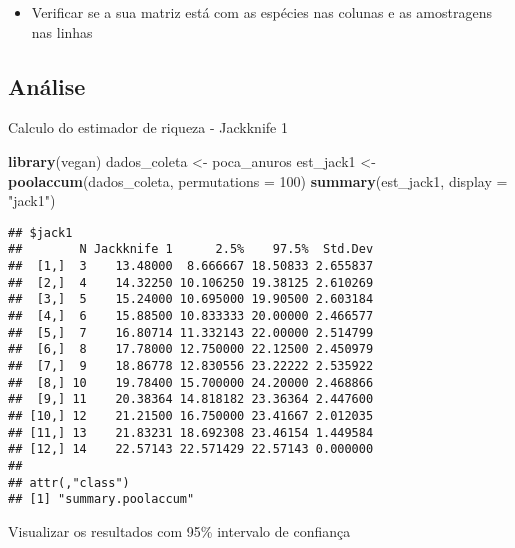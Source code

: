 \documentclass[
]{book}
\newenvironment{Shaded}{\begin{snugshade}}{\end{snugshade}}
\newcommand{\DataTypeTok}[1]{\textcolor[rgb]{0.13,0.29,0.53}{#1}}
\newcommand{\DecValTok}[1]{\textcolor[rgb]{0.00,0.00,0.81}{#1}}
\newcommand{\KeywordTok}[1]{\textcolor[rgb]{0.13,0.29,0.53}{\textbf{#1}}}
\newcommand{\NormalTok}[1]{#1}
\newcommand{\StringTok}[1]{\textcolor[rgb]{0.31,0.60,0.02}{#1}}
\providecommand{\tightlist}{%
  \setlength{\itemsep}{0pt}\setlength{\parskip}{0pt}}
\begin{document}
\begin{itemize}
\tightlist
\item
  Verificar se a sua matriz está com as espécies nas colunas e as amostragens nas linhas
\end{itemize}

\hypertarget{anuxe1lise-3}{%
\subsection{Análise}\label{anuxe1lise-3}}

Calculo do estimador de riqueza - Jackknife 1

\begin{Shaded}
\begin{Highlighting}[]
\KeywordTok{library}\NormalTok{(vegan)}
\NormalTok{dados_coleta <-}\StringTok{ }\NormalTok{poca_anuros}
\NormalTok{est_jack1 <-}\StringTok{ }\KeywordTok{poolaccum}\NormalTok{(dados_coleta, }\DataTypeTok{permutations =} \DecValTok{100}\NormalTok{)}
\KeywordTok{summary}\NormalTok{(est_jack1, }\DataTypeTok{display =} \StringTok{"jack1"}\NormalTok{)}
\end{Highlighting}
\end{Shaded}

\begin{verbatim}
## $jack1
##        N Jackknife 1      2.5%    97.5%  Std.Dev
##  [1,]  3    13.48000  8.666667 18.50833 2.655837
##  [2,]  4    14.32250 10.106250 19.38125 2.610269
##  [3,]  5    15.24000 10.695000 19.90500 2.603184
##  [4,]  6    15.88500 10.833333 20.00000 2.466577
##  [5,]  7    16.80714 11.332143 22.00000 2.514799
##  [6,]  8    17.78000 12.750000 22.12500 2.450979
##  [7,]  9    18.86778 12.830556 23.22222 2.535922
##  [8,] 10    19.78400 15.700000 24.20000 2.468866
##  [9,] 11    20.38364 14.818182 23.36364 2.447600
## [10,] 12    21.21500 16.750000 23.41667 2.012035
## [11,] 13    21.83231 18.692308 23.46154 1.449584
## [12,] 14    22.57143 22.571429 22.57143 0.000000
## 
## attr(,"class")
## [1] "summary.poolaccum"
\end{verbatim}

Visualizar os resultados com 95\% intervalo de confiança
\end{document}
